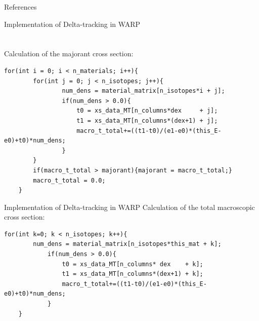 \documentclass[xcolor=x11names, compress]{beamer}
\renewcommand{\(}{\begin{columns}}
\renewcommand{\)}{\end{columns}}
\newcommand{\<}[1]{\begin{column}{#1}}
\renewcommand{\>}{\end{column}}
\begin{document}

\begin{frame}{References}
	
	
\end{frame}

\begin{frame}{Implementation of Delta-tracking in WARP}
\section*{}
	Calculation of the majorant cross section:
	\vspace{5 mm}
	\begin{Verbatim}[fontsize=\footnotesize]
	for(int i = 0; i < n_materials; i++){
	    for(int j = 0; j < n_isotopes; j++){
	            num_dens = material_matrix[n_isotopes*i + j];
	            if(num_dens > 0.0){
	                t0 = xs_data_MT[n_columns*dex     + j];
	                t1 = xs_data_MT[n_columns*(dex+1) + j];
	                macro_t_total+=((t1-t0)/(e1-e0)*(this_E-e0)+t0)*num_dens;
	            }
	    }
	    if(macro_t_total > majorant){majorant = macro_t_total;}
	    macro_t_total = 0.0;
	}
	\end{Verbatim}
\end{frame}


\begin{frame}{Implementation of Delta-tracking in WARP}
	Calculation of the total macroscopic cross section:
	\vspace{5 mm}
	\begin{Verbatim}[fontsize=\footnotesize]
	for(int k=0; k < n_isotopes; k++){
	    num_dens = material_matrix[n_isotopes*this_mat + k];
	        if(num_dens > 0.0){
	            t0 = xs_data_MT[n_columns* dex    + k];
	            t1 = xs_data_MT[n_columns*(dex+1) + k];
	            macro_t_total+=((t1-t0)/(e1-e0)*(this_E-e0)+t0)*num_dens;
	        }
	}
	\end{Verbatim}
\end{frame}
\end{document}
